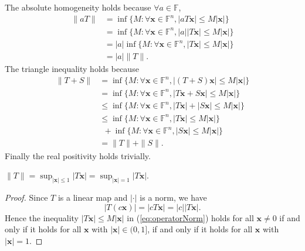 \begin{solution}
  The absolute homogeneity holds because $\forall a \in \mathbb{F}$, 
  \begin{displaymath}
    \begin{array}{rl}
      \|aT\| &= \inf\{M:\forall \mathbf{x} \in \mathbb{F}^n,|aT
               \mathbf{x} | \leq M|\mathbf{x}|\}
      \\ &= \inf\{M:\forall \mathbf{x} \in
           \mathbb{F}^n,|a||T\mathbf{x}| \leq M|\mathbf{x}|\}
      \\ &= |a|\inf\{M:\forall \mathbf{x} \in
           \mathbb{F}^n,|T\mathbf{x}| \leq M|\mathbf{x}|\}
      \\ &= |a|\|T\|.
    \end{array}
  \end{displaymath}
  The triangle inequality holds because
  \begin{displaymath}
    \begin{array}{rl}
      \|T + S\| &= \inf\{M: \forall \mathbf{x} \in \mathbb{F}^n,
                  |(T+S)\mathbf{x}| \leq M|\mathbf{x}|\}\\
      &= \inf\{M:\forall \mathbf{x} \in \mathbb{F}^n, |T\mathbf{x}+S\mathbf{x}| \leq M|\mathbf{x}|\} \\
      &\leq \inf\{M:\forall \mathbf{x} \in \mathbb{F}^n, |T\mathbf{x}|+|S\mathbf{x}| \leq M|\mathbf{x}|\}\\
      &\leq \inf\{M:\forall \mathbf{x} \in \mathbb{F}^n,
        |T\mathbf{x}| \leq M|\mathbf{x}|\} \\
      &\ \  + \inf\{M:\forall \mathbf{x} \in \mathbb{F}^n, |S\mathbf{x}| \leq M|\mathbf{x}|\}\\
      &= \|T\| + \|S\|.
    \end{array}
  \end{displaymath}
  Finally the real positivity holds trivially.
\end{solution}

\begin{coro}
  \label{coro:operatorNormAsSupOf2norm}
  $\|T\|=\sup_{|\mathbf{x}|\le 1} |T \mathbf{x}|
  = \sup_{|\mathbf{x}|=1} |T\mathbf{x}|$.
\end{coro}
\begin{proof}
  Since $T$ is a linear map
  and $|\cdot|$ is a norm,
  we have
  \begin{displaymath}
    |T(c\mathbf{x})|=|cT\mathbf{x}|=|c||T\mathbf{x}|.
  \end{displaymath}
  Hence the inequality $|T\mathbf{x}| \le M |\mathbf{x}|$
  in (\ref{eq:operatorNorm}) holds
  for all $\mathbf{x}\ne 0$
  if and only if it holds for all $\mathbf{x}$
  with $|\mathbf{x}|\in (0,1]$, 
  if and only if it holds for all $\mathbf{x}$
  with $|\mathbf{x}|=1$.
\end{proof}

